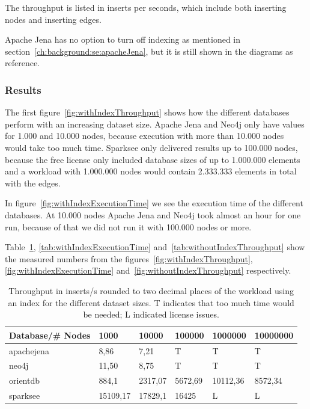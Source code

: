The throughput is listed in inserts per seconds,
which include both inserting nodes and inserting edges.

Apache Jena has no option to turn off indexing as mentioned in section~\ref{ch:background:se:apacheJena},
but it is still shown in the diagrams as reference.

\subsubsection{Results}
The first figure~\ref{fig:withIndexThroughput} shows how the different databases perform with an increasing dataset size.
Apache Jena and Neo4j only have values for 1.000 and 10.000 nodes,
because execution with more than 10.000 nodes would take too much time.
Sparksee only delivered results up to 100.000 nodes,
because the free license only included database sizes of up to 1.000.000 elements and a workload with 1.000.000 nodes would contain 2.333.333 elements in total with the edges.

In figure~\ref{fig:withIndexExecutionTime} we see the execution time of the different databases.
At 10.000 nodes Apache Jena and Neo4j took almost an hour for one run,
because of that we did not run it with 100.000 nodes or more.

Table~\ref{tab:withIndexThroughput},
\ref{tab:withIndexExecutionTime} and~\ref{tab:withoutIndexThroughput} show the measured numbers from the figures~\ref{fig:withIndexThroughput},
\ref{fig:withIndexExecutionTime} and~\ref{fig:withoutIndexThroughput} respectively.

\begin{table}[h!]
  \begin{minipage}{\textwidth}
    \centering
    \begin{tabularx}{\textwidth}{ | l | X | X | X | X | X | }
      \hline
      Database/\# Nodes & 1000 & 10000 & 100000 & 1000000 & 10000000 \\ \hline
      apachejena & 8,86 & 7,21 & T & T & T \\ \hline
      neo4j & 11,50 & 8,75 & T & T & T \\ \hline
      orientdb & 884,1 & 2317,07 & 5672,69 & 10112,36 & 8572,34 \\ \hline
      sparksee & 15109,17 & 17829,1 & 16425 & L & L \\ \hline
    \end{tabularx}
  \end{minipage}
  \caption{Throughput in inserts/s rounded to two decimal places of the workload using an index for the different dataset sizes. T indicates that too much time would be needed; L indicated license issues.}
  \label{tab:withIndexThroughput}
\end{table}

